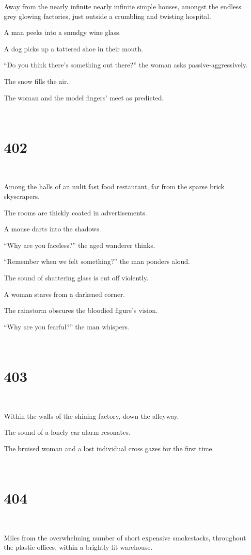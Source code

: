 \documentclass{report}
\begin{document}
Away from the nearly infinite nearly infinite simple houses, amongst the endless grey glowing factories, just outside a crumbling and twisting hospital.

A man peeks into a smudgy wine glass.

A dog picks up a tattered shoe in their mouth.

``Do you think there's something out there?'' the woman asks passive-aggressively.

The snow fills the air.

The woman and the model fingers' meet as predicted.

~
\chapter*{402}
~

Among the halls of an unlit fast food restaurant, far from the sparse brick skyscrapers.

The rooms are thickly coated in advertisements.

A mouse darts into the shadows.

``Why are you faceless?'' the aged wanderer thinks.

``Remember when we felt something?'' the man ponders aloud.

The sound of shattering glass is cut off violently.

A woman stares from a darkened corner.

The rainstorm obscures the bloodied figure's vision.

``Why are you fearful?'' the man whispers.

~
\chapter*{403}
~

Within the walls of the shining factory, down the alleyway.

The sound of a lonely car alarm resonates.

The bruised woman and a lost individual cross gazes for the first time.

~
\chapter*{404}
~

Miles from the overwhelming number of short expensive smokestacks, throughout the plastic offices, within a brightly lit warehouse.
\end{document}
